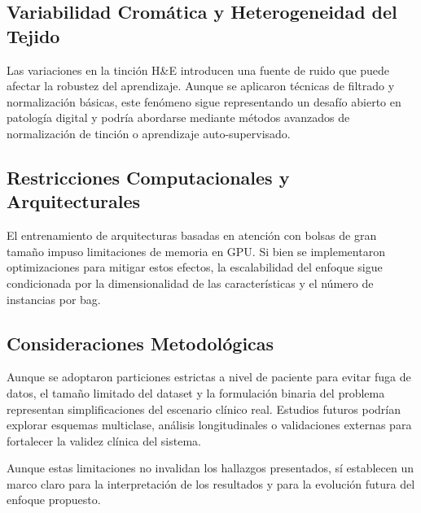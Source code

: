 \subsection{Variabilidad Cromática y Heterogeneidad del Tejido}
Las variaciones en la tinción H\&E introducen una fuente de ruido que puede afectar la robustez del aprendizaje. Aunque se aplicaron técnicas de filtrado y normalización básicas, este fenómeno sigue representando un desafío abierto en patología digital y podría abordarse mediante métodos avanzados de normalización de tinción o aprendizaje auto-supervisado.

\subsection{Restricciones Computacionales y Arquitecturales}
El entrenamiento de arquitecturas basadas en atención con bolsas de gran tamaño impuso limitaciones de memoria en GPU. Si bien se implementaron optimizaciones para mitigar estos efectos, la escalabilidad del enfoque sigue condicionada por la dimensionalidad de las características y el número de instancias por bag.

\subsection{Consideraciones Metodológicas}
Aunque se adoptaron particiones estrictas a nivel de paciente para evitar fuga de datos, el tamaño limitado del dataset y la formulación binaria del problema representan simplificaciones del escenario clínico real. Estudios futuros podrían explorar esquemas multiclase, análisis longitudinales o validaciones externas para fortalecer la validez clínica del sistema.\newline

Aunque estas limitaciones no invalidan los hallazgos presentados, sí establecen un marco claro para la interpretación de los resultados y para la evolución futura del enfoque propuesto.
